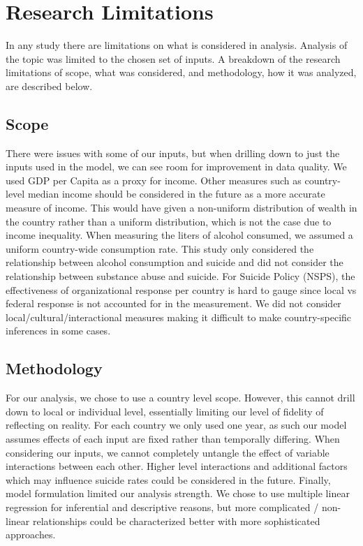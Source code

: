 \documentclass[]{article}
\begin{document}
\section{Research Limitations}\label{research-limitations}

In any study there are limitations on what is considered in analysis.
Analysis of the topic was limited to the chosen set of inputs. A
breakdown of the research limitations of scope, what was considered, and
methodology, how it was analyzed, are described below.

\subsection{Scope}\label{scope}

There were issues with some of our inputs, but when drilling down to
just the inputs used in the model, we can see room for improvement in
data quality. We used GDP per Capita as a proxy for income. Other
measures such as country-level median income should be considered in the
future as a more accurate measure of income. This would have given a
non-uniform distribution of wealth in the country rather than a uniform
distribution, which is not the case due to income inequality. When
measuring the liters of alcohol consumed, we assumed a uniform
country-wide consumption rate. This study only considered the
relationship between alcohol consumption and suicide and did not
consider the relationship between substance abuse and suicide. For
Suicide Policy (NSPS), the effectiveness of organizational response per
country is hard to gauge since local vs federal response is not
accounted for in the measurement. We did not consider
local/cultural/interactional measures making it difficult to make
country-specific inferences in some cases.

\subsection{Methodology}\label{methodology}

For our analysis, we chose to use a country level scope. However, this
cannot drill down to local or individual level, essentially limiting our
level of fidelity of reflecting on reality. For each country we only
used one year, as such our model assumes effects of each input are fixed
rather than temporally differing. When considering our inputs, we cannot
completely untangle the effect of variable interactions between each
other. Higher level interactions and additional factors which may
influence suicide rates could be considered in the future. Finally,
model formulation limited our analysis strength. We chose to use
multiple linear regression for inferential and descriptive reasons, but
more complicated / non-linear relationships could be characterized
better with more sophisticated approaches.
\end{document}

